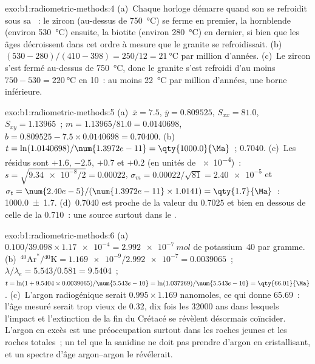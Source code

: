 \begin{solution}{exo:b1:radiometric-methods:4}
(a)~Chaque horloge démarre quand son  se refroidit sous sa ~:
le zircon (au-dessus de \qty{750}{\celsius}) se ferme en premier, la hornblende (environ
\qty{530}{\celsius}) ensuite, la biotite (environ \qty{280}{\celsius}) en dernier, si bien que les âges
décroissent dans cet ordre à mesure que le granite se refroidissait. (b)~$(530 - 280)/(410 - 398) =
250/12 = \qty{21}{\celsius}$ par million d'années. (c)~Le zircon s'est fermé au-dessus de
\qty{750}{\celsius}, donc le granite s'est refroidi d'au moins $750 - 530 =
\qty{220}{\celsius}$ en \qty{10}{\Ma}~: au moins \qty{22}{\celsius} par million
d'années, une borne inférieure.
\end{solution}

\begin{solution}{exo:b1:radiometric-methods:5}
(a)~$\bar x = 7.5$, $\bar y = 0.809525$, $S_{xx} = 81.0$, $S_{xy} = 1.13965$~;
$m = 1.13965/81.0 = 0.0140698$, $b = 0.809525 - 7.5 \times 0.0140698 = 0.70400$.
(b)~$t = \ln(1.0140698)/\num{1.3972e-11} = \qty{1000.0}{\Ma}$~; 
$0.7040$. (c)~Les résidus sont $+1.6$, $-2.5$, $+0.7$ et $+0.2$ (en unités de
\num{e-4})~: $s = \sqrt{\num{9.34e-8}/2} = 0.00022$, $\sigma_m = 0.00022/\sqrt{81}
= \num{2.40e-5}$ et $\sigma_t = \num{2.40e-5}/(\num{1.3972e-11} \times 1.0141) =
\qty{1.7}{\Ma}$~: \qty[uncertainty-mode=separate]{1000.0(17)}{\Ma}. (d)~$0.7040$
est proche de la valeur du  $0.7025$ et bien en dessous de celle de la  $0.710$~: une source
surtout dans le .
\end{solution}

\begin{solution}{exo:b1:radiometric-methods:6}
(a)~$0.100/39.098 \times \num{1.17e-4} = \qty{2.992e-7}{mol}$ de potassium~40 par
gramme. (b)~${}^{40}\mathrm{Ar}^*/{}^{40}\mathrm{K} = \num{1.169e-9}/\num{2.992e-7}
= 0.0039065$~; $\lambda/\lambda_e = 5.543/0.581 = 9.5404$~; $t = \ln(1 + 9.5404
\times 0.0039065)/\num{5.543e-10} = \ln(1.037269)/\num{5.543e-10} =
\qty{66.01}{\Ma}$. (c)~L'argon radiogénique serait $0.995 \times 1.169$
nanomoles, ce qui donne \qty{65.69}{\Ma}~: l'âge mesuré serait trop vieux de \qty{0.32}{\Ma},
dix fois les \num{32000} ans dans lesquels l'impact et
l'extinction de la fin du Crétacé se révèlent désormais coïncider. L'argon en excès est une préoccupation surtout dans les roches jeunes et les roches totales~; un
 tel que la sanidine ne doit pas prendre d'argon en cristallisant, et un
spectre d'âge argon--argon le révélerait.
\end{solution}

